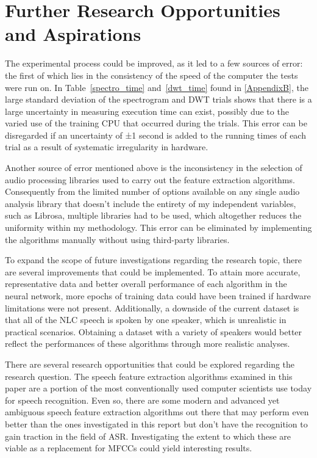 
\section{Further Research Opportunities and Aspirations}

The experimental process could be improved, as it led to a few sources of error: the first of which lies in the consistency of the speed of the computer the tests were run on. In Table~\ref{spectro_time} and~\ref{dwt_time} found in \autoref{AppendixB}, the large standard deviation of the spectrogram and DWT trials shows that there is a large uncertainty in measuring execution time can exist, possibly due to the varied use of the training CPU that occurred during the trials. This error can be disregarded if an uncertainty of ±1 second is added to the running times of each trial as a result of systematic irregularity in hardware.
\par
Another source of error mentioned above is the inconsistency in the selection of audio processing libraries used to carry out the feature extraction algorithms. Consequently from the limited number of options available on any single audio analysis library that doesn’t include the entirety of my independent variables, such as Librosa, multiple libraries had to be used, which altogether reduces the uniformity within my methodology. This error can be eliminated by implementing the algorithms manually without using third-party libraries.
\par
To expand the scope of future investigations regarding the research topic, there are several improvements that could be implemented. To attain more accurate, representative data and better overall performance of each algorithm in the neural network, more epochs of training data could have been trained if hardware limitations were not present. Additionally, a downside of the current dataset is that all of the NLC speech is spoken by one speaker, which is unrealistic in practical scenarios. Obtaining a dataset with a variety of speakers would better reflect the performances of these algorithms through more realistic analyses.\\
\par
There are several research opportunities that could be explored regarding the research question. The speech feature extraction algorithms examined in this paper are a portion of the most conventionally used computer scientists use today for speech recognition. Even so, there are some modern and advanced yet ambiguous speech feature extraction algorithms out there that may perform even better than the ones investigated in this report but don’t have the recognition to gain traction in the field of ASR. Investigating the extent to which these are viable as a replacement for MFCCs could yield interesting results. 
